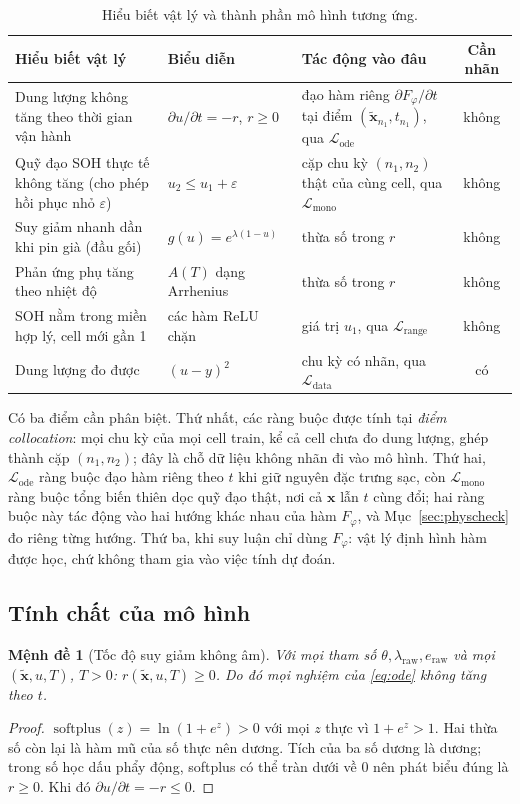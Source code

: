 \documentclass[12pt,a4paper,oneside]{report}
\theoremstyle{plain}
\newtheorem{menhde}{Mệnh đề}[chapter]
\theoremstyle{definition}
\begin{document}
\begin{table}[!htbp]\centering\small
\caption{Hiểu biết vật lý và thành phần mô hình tương ứng.}\label{tab:physmap}
\begin{tabularx}{\textwidth}{>{\raggedright}p{3.6cm}>{\raggedright}p{3.4cm}>{\raggedright}X c}
\toprule
Hiểu biết vật lý & Biểu diễn & Tác động vào đâu & Cần nhãn \\
\midrule
Dung lượng không tăng theo thời gian vận hành & $\partial u/\partial t = -r$, $r \ge 0$ & đạo hàm riêng
$\partial F_\varphi/\partial t$ tại điểm $(\tilde{\mathbf{x}}_{n_1}, t_{n_1})$, qua $\mathcal{L}_\text{ode}$ & không \\
Quỹ đạo SOH thực tế không tăng (cho phép hồi phục nhỏ $\varepsilon$) & $u_2 \le u_1 + \varepsilon$ & cặp chu kỳ
$(n_1, n_2)$ thật của cùng cell, qua $\mathcal{L}_\text{mono}$ & không \\
Suy giảm nhanh dần khi pin già (đầu gối) & $g(u) = e^{\lambda(1-u)}$ & thừa số trong $r$ & không \\
Phản ứng phụ tăng theo nhiệt độ & $A(T)$ dạng Arrhenius & thừa số trong $r$ & không \\
SOH nằm trong miền hợp lý, cell mới gần 1 & các hàm ReLU chặn & giá trị $u_1$, qua $\mathcal{L}_\text{range}$ & không \\
Dung lượng đo được & $(u - y)^2$ & chu kỳ có nhãn, qua $\mathcal{L}_\text{data}$ & có \\
\bottomrule
\end{tabularx}
\end{table}

Có ba điểm cần phân biệt. Thứ nhất, các ràng buộc được tính tại \emph{điểm collocation}: mọi chu kỳ của mọi cell
train, kể cả cell chưa đo dung lượng, ghép thành cặp $(n_1, n_2)$; đây là chỗ dữ liệu không nhãn đi vào mô hình.
Thứ hai, $\mathcal{L}_\text{ode}$ ràng buộc đạo hàm riêng theo $t$ khi giữ nguyên đặc trưng sạc, còn
$\mathcal{L}_\text{mono}$ ràng buộc tổng biến thiên dọc quỹ đạo thật, nơi cả $\mathbf{x}$ lẫn $t$ cùng đổi; hai
ràng buộc này tác động vào hai hướng khác nhau của hàm $F_\varphi$, và Mục~\ref{sec:physcheck} đo riêng từng hướng.
Thứ ba, khi suy luận chỉ dùng $F_\varphi$: vật lý định hình hàm được học, chứ không tham gia vào việc tính dự đoán.

\subsection{Tính chất của mô hình}

\begin{menhde}[Tốc độ suy giảm không âm]\label{md:rate}
Với mọi tham số $\theta, \lambda_\text{raw}, e_\text{raw}$ và mọi $(\tilde{\mathbf{x}}, u, T)$, $T > 0$:
$r(\tilde{\mathbf{x}}, u, T) \ge 0$. Do đó mọi nghiệm của \eqref{eq:ode} không tăng theo $t$.
\end{menhde}
\begin{proof}
$\operatorname{softplus}(z) = \ln(1+e^z) > 0$ với mọi $z$ thực vì $1 + e^z > 1$. Hai thừa số còn lại là hàm
mũ của số thực nên dương. Tích của ba số dương là dương; trong số học dấu phẩy động, softplus có thể tràn
dưới về $0$ nên phát biểu đúng là $r \ge 0$. Khi đó $\partial u/\partial t = -r \le 0$.
\end{proof}
\end{document}
